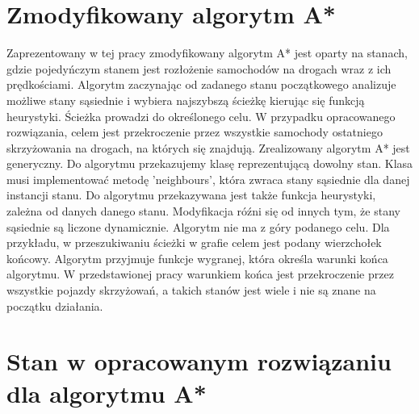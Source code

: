 \section{Zmodyfikowany algorytm A*}

Zaprezentowany w tej pracy zmodyfikowany algorytm A* jest oparty na stanach, gdzie pojedyńczym stanem jest rozłożenie samochodów na drogach wraz z ich prędkościami. Algorytm zaczynając od zadanego stanu początkowego analizuje możliwe stany sąsiednie i wybiera najszybszą ścieżkę kierując się funkcją heurystyki. Ścieżka prowadzi do określonego celu. W przypadku opracowanego rozwiązania, celem jest przekroczenie przez wszystkie samochody ostatniego skrzyżowania na drogach, na których się znajdują.
\newline
\indent
Zrealizowany algorytm A* jest generyczny. Do algorytmu przekazujemy klasę reprezentującą dowolny stan. Klasa musi implementować metodę 'neighbours', która zwraca stany sąsiednie dla danej instancji stanu. Do algorytmu przekazywana jest także funkcja heurystyki, zależna od danych danego stanu.
\newline
\indent
Modyfikacja róźni się od innych tym, że stany sąsiednie są liczone dynamicznie. Algorytm nie ma z góry podanego celu. Dla przykładu, w przeszukiwaniu ścieżki w grafie celem jest podany wierzchołek końcowy. Algorytm przyjmuje funkcje wygranej, która określa warunki końca algorytmu. W przedstawionej pracy warunkiem końca jest przekroczenie przez wszystkie pojazdy skrzyżowań, a takich stanów jest wiele i nie są znane na początku działania.

\section{Stan w opracowanym rozwiązaniu dla algorytmu A*}

